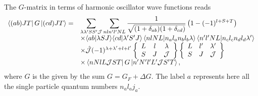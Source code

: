 The $G$-matrix in terms of harmonic oscillator wave functions reads
\begin{equation}
   \begin{array}{ll}
  \left\langle (ab)JT \right|G\left| (cd)JT \right\rangle=&
  {\displaystyle \sum_{\lambda \lambda ' SS' {\cal J}}\sum_{nln'l'NL}
  \frac{1}{\sqrt{(1+\delta_{ab})
  (1+\delta_{cd})}}\left(1-(-1)^{l+S+T}\right)}
  \\
  &\times\langle ab|\lambda SJ\rangle \langle cd|\lambda 'S'J\rangle
  \left\langle nlNL| n_{a}l_{a}n_{b}l_{b}\lambda\right\rangle
  \left\langle n'l'NL| n_{c}l_{c}n_{d}l_{d}\lambda ' \right\rangle
  \\
  &\times \hat{{\cal J}}(-1)^{\lambda + \lambda ' +l +l'}
  \left\{\begin{array}{ccc}L&l&\lambda\\S&J&{\cal J}
  \end{array}\right\}
  \left\{\begin{array}{ccc}L&l'&\lambda '\\S&J&{\cal J}
  \end{array}\right\}
  \\
  &\times\left\langle nNlL{\cal J}ST \right|G\left| n'N'l'L'{\cal J}S'T \right\rangle,
  \end{array} \label{eq:gmat2}
\end{equation}
where $G$ is the given by the sum $G = G_{F} +\Delta G$.
The label $a$ represents here all the single particle quantum numbers
$n_{a}l_{a}j_{a}$.

